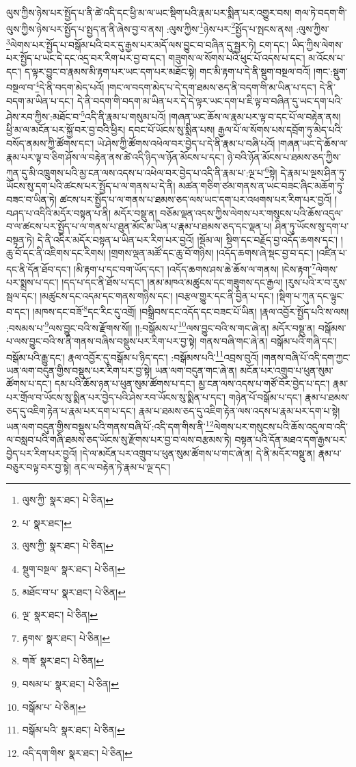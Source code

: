 ལུས་ཀྱིས་ཉེས་པར་སྤྱོད་པ་ནི་ཚེ་འདི་དང་ཕྱི་མ་ལ་ཡང་སྡིག་པའི་རྣམ་པར་སྨིན་པར་འགྱུར་བས། གལ་ཏེ་བདག་གི་ལུས་ཀྱིས་ཉེས་པར་སྤྱོད་པ་སྤྱད་ན་ནི་ཞེས་བྱ་བ་ནས། :ལུས་ཀྱིས་\footnote{ལུས་ཀྱི་  སྣར་ཐང་།  པེ་ཅིན། }ཉེས་པར་\footnote{པ་  སྣར་ཐང་། }སྤྱོད་པ་སྤངས་ནས། :ལུས་ཀྱིས་\footnote{ལུས་ཀྱི་  སྣར་ཐང་།  པེ་ཅིན། }ལེགས་པར་སྤྱོད་པ་བསྒོམ་པའི་བར་དུ་རྒྱས་པར་མདོ་ལས་བྱུང་བ་བཞིན་དུ་སྦྱར་ཏེ། ངག་དང་། ཡིད་ཀྱིས་ལེགས་པར་སྤྱོད་པ་ཡང་དེ་དང་འདྲ་བར་རིག་པར་བྱ་བ་དང་། གཟུགས་ལ་སོགས་པའི་ཕུང་པོ་འདས་པ་དང་། མ་འོངས་པ་དང་། ད་ལྟར་བྱུང་བ་རྣམས་མི་རྟག་པར་ཡང་དག་པར་མཐོང་སྟེ། གང་མི་རྟག་པ་དེ་ནི་སྡུག་བསྔལ་བའོ། །གང་:སྡུག་བསྔལ་བ་\footnote{སྡུག་བསྔལ་  སྣར་ཐང་།  པེ་ཅིན། }དེ་ནི་བདག་མེད་པའོ། །གང་ལ་བདག་མེད་པ་དེ་དག་ཐམས་ཅད་ནི་བདག་གི་མ་ཡིན་པ་དང་། དེ་ནི་བདག་མ་ཡིན་པ་དང་། དེ་ནི་བདག་གི་བདག་མ་ཡིན་པར་དེ་དེ་ལྟར་ཡང་དག་པ་ཇི་ལྟ་བ་བཞིན་དུ་ཡང་དག་པའི་ཤེས་རབ་ཀྱིས་:མཐོང་བ་\footnote{མཐོང་བ་པ་  སྣར་ཐང་།  པེ་ཅིན། }འདི་ནི་རྣམ་པ་གསུམ་པའོ། །གཞན་ཡང་ཆོས་ལ་རྣམ་པར་ལྟ་བ་དང་པོ་ལ་བརྟེན་ནས། ཕྱི་མ་ལ་མངོན་པར་སྐྱོ་བར་བྱ་བའི་ཕྱིར། དབང་པོ་ཡོངས་སུ་སྨིན་པས། རྒྱལ་པོ་ལ་སོགས་པས་དབྲོག་ཏུ་མེད་པའི་བསོད་ནམས་ཀྱི་ཚོགས་དང་། ཡེ་ཤེས་ཀྱི་ཚོགས་འཕེལ་བར་བྱེད་པ་དེ་ནི་རྣམ་པ་བཞི་པའོ། །གཞན་ཡང་དེ་ཆོས་ལ་རྣམ་པར་ལྟ་བ་ཅིག་ཤོས་ལ་བརྟེན་ནས་ཚེ་འདི་ཉིད་ལ་ཉོན་མོངས་པ་དང་། ཉེ་བའི་ཉོན་མོངས་པ་ཐམས་ཅད་ཀྱིས་ཀུན་དུ་མི་འཁྲུགས་པའི་མྱ་ངན་ལས་འདས་པ་འཕེལ་བར་བྱེད་པ་འདི་ནི་རྣམ་པ་:ལྔ་པ་\footnote{ལྔ་  སྣར་ཐང་།  པེ་ཅིན། }སྟེ། དེ་རྣམ་པ་ལྔས་ཤིན་ཏུ་ཡོངས་སུ་དག་པའི་ཚངས་པར་སྤྱོད་པ་ལ་གནས་པ་དེ་ནི། མཚན་གཅིག་ཙམ་གནས་ན་ཡང་བཟང་ཞིང་མཆོག་ཏུ་བཟང་བ་ཡིན་ཏེ། ཚངས་པར་སྤྱོད་པ་ལ་གནས་པ་ཐམས་ཅད་ལས་ཡང་དག་པར་འཕགས་པར་རིག་པར་བྱའོ། །བཤད་པ་འདིའི་མདོར་བསྟན་པ་ནི། མདོར་བསྡུ་ན། བཅོམ་ལྡན་འདས་ཀྱིས་ལེགས་པར་གསུངས་པའི་ཆོས་འདུལ་བ་ལ་ཚངས་པར་སྤྱོད་པ་ལ་གནས་པ་ཐུན་མོང་མ་ཡིན་པ་རྣམ་པ་ཐམས་ཅད་དང་ལྡན་པ། ཤིན་ཏུ་ཡོངས་སུ་དག་པ་བསྟན་ཏེ། དེ་ནི་འདིར་མདོར་བསྟན་པ་ཡིན་པར་རིག་པར་བྱའོ། །སྡོམ་ལ། སྡིག་དང་བརྗོད་བྱ་འདོད་ཆགས་དང་། །ཆུ་བོ་དང་ནི་འཇིགས་དང་རིགས། །གྲགས་ལྡན་མཚོ་དང་ཆུ་བོ་གཉིས། །འདོད་ཆགས་ཞེ་སྡང་བྱ་བ་དང་། །འཛིན་པ་དང་ནི་དོན་ཐོབ་དང་། །མི་རྟག་པ་དང་བག་ཡོད་དང་། །འདོད་ཆགས་ཤས་ཆེ་ཆོས་ལ་གནས། །ངེས་རྟག་\footnote{རྟགས་  སྣར་ཐང་།  པེ་ཅིན། }ལེགས་པར་སྨྲས་པ་དང་། །དད་པ་དང་ནི་ཐོས་པ་དང་། །ནམ་མཁའ་མཚུངས་དང་གཟུགས་དང་རྒྱལ། །རུས་པའི་ར་བ་རུས་སྦལ་དང་། །མཚུངས་དང་འདམ་དང་གནས་གཉིས་དང་། །བརྩལ་གྱུར་དང་ནི་བྱིན་པ་དང་། །སྡིག་པ་ཀུན་དང་ལྟུང་བ་དང་། །མཁས་དང་བཟོ་\footnote{གཟོ་  སྣར་ཐང་།  པེ་ཅིན། }དང་རིང་དུ་འགྲོ། །བསྒྲིབས་དང་འདོད་དང་བཟང་པོ་ཡིན། །རྣལ་འབྱོར་སྤྱོད་པའི་ས་ལས། :བསམས་པ་\footnote{བསམ་པ་  སྣར་ཐང་།  པེ་ཅིན། }ལས་བྱུང་བའི་ས་རྫོགས་སོ།། །།:བསྒོམས་པ་\footnote{བསྒོམ་པ་  པེ་ཅིན། }ལས་བྱུང་བའི་ས་གང་ཞེ་ན། མདོར་བསྡུ་ན། བསྒོམས་པ་ལས་བྱུང་བའི་ས་ནི་གནས་བཞིས་བསྡུས་པར་རིག་པར་བྱ་སྟེ། གནས་བཞི་གང་ཞེ་ན། བསྒོམ་པའི་གཞི་དང་། བསྒོམ་པའི་རྒྱུ་དང་། རྣལ་འབྱོར་དུ་བསྒོམ་པ་ཉིད་དང་། :བསྒོམས་པའི་\footnote{བསྒོམ་པའི་  སྣར་ཐང་།  པེ་ཅིན། }འབྲས་བུའོ། །གནས་བཞི་པོ་འདི་དག་ཀྱང་ཡན་ལག་བདུན་གྱིས་བསྡུས་པར་རིག་པར་བྱ་སྟེ། ཡན་ལག་བདུན་གང་ཞེ་ན། མངོན་པར་འགྲུབ་པ་ཕུན་སུམ་ཚོགས་པ་དང་། དམ་པའི་ཆོས་ཉན་པ་ཕུན་སུམ་ཚོགས་པ་དང་། མྱ་ངན་ལས་འདས་པ་གཙོ་བོར་བྱེད་པ་དང་། རྣམ་པར་གྲོལ་བ་ཡོངས་སུ་སྨིན་པར་བྱེད་པའི་ཤེས་རབ་ཡོངས་སུ་སྨིན་པ་དང་། གཉེན་པོ་བསྒོམ་པ་དང་། རྣམ་པ་ཐམས་ཅད་དུ་འཇིག་རྟེན་པ་རྣམ་པར་དག་པ་དང་། རྣམ་པ་ཐམས་ཅད་དུ་འཇིག་རྟེན་ལས་འདས་པ་རྣམ་པར་དག་པ་སྟེ། ཡན་ལག་བདུན་གྱིས་བསྡུས་པའི་གནས་བཞི་པོ་:འདི་དག་གིས་ནི་\footnote{འདི་དག་གིས་  སྣར་ཐང་།  པེ་ཅིན། }ལེགས་པར་གསུངས་པའི་ཆོས་འདུལ་བ་འདི་ལ་བསླབ་པའི་གཞི་ཐམས་ཅད་ཡོངས་སུ་རྫོགས་པར་བྱ་བ་ལས་བརྩམས་ཏེ། བསྟན་པའི་དོན་མཐའ་དག་རྒྱས་པར་བྱེད་པར་རིག་པར་བྱའོ། །དེ་ལ་མངོན་པར་འགྲུབ་པ་ཕུན་སུམ་ཚོགས་པ་གང་ཞེ་ན། དེ་ནི་མདོར་བསྡུ་ན། རྣམ་པ་བཅུར་བལྟ་བར་བྱ་སྟེ། ནང་ལ་བརྟེན་ཏེ་རྣམ་པ་ལྔ་དང་། 